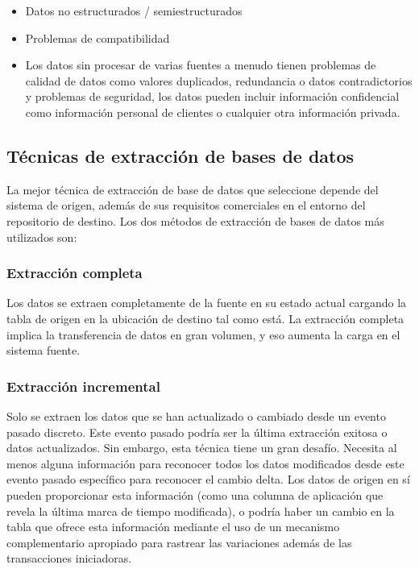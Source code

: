 \documentclass[twoside,twocolumn]{article}
\begin{document}
\begin{itemize}
    \item 	Datos no estructurados / semiestructurados 
    \item 	Problemas de compatibilidad
    \item 	Los datos sin procesar de varias fuentes a menudo tienen problemas de calidad de datos como valores duplicados, redundancia o datos contradictorios y problemas de seguridad, los datos pueden incluir información confidencial como información personal de clientes o cualquier otra información privada. 
\end{itemize}


\subsection{Técnicas de extracción de bases de datos}
La mejor técnica de extracción de base de datos que seleccione
 depende del sistema de origen, además de sus requisitos comerciales
  en el entorno del repositorio de destino. Los dos métodos de extracción
   de bases de datos más utilizados son:


\subsubsection{Extracción completa}

Los datos se extraen completamente de la fuente en su estado
 actual cargando la tabla de origen en la ubicación de destino
  tal como está. La extracción completa implica la transferencia
   de datos en gran volumen, y eso aumenta la carga en el sistema fuente.
    

\subsubsection{Extracción incremental}
Solo se extraen los datos que se han actualizado o 
cambiado desde un evento pasado discreto. Este evento 
pasado podría ser la última extracción exitosa o datos 
actualizados. Sin embargo, esta técnica tiene un gran desafío.
 Necesita al menos alguna información para reconocer todos los 
 datos modificados desde este evento pasado específico para reconocer
  el cambio delta. Los datos de origen en sí pueden proporcionar esta 
  información (como una columna de aplicación que revela la última marca 
  de tiempo modificada), o podría haber un cambio en la tabla que ofrece 
  esta información mediante el uso de un mecanismo complementario apropiado
   para rastrear las variaciones además de las transacciones iniciadoras.
\end{document}

